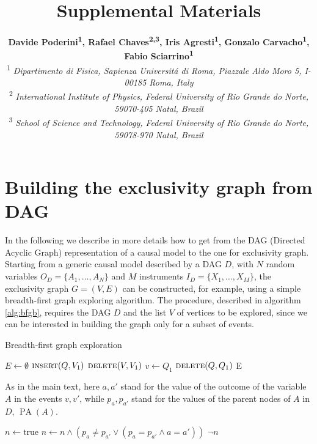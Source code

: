 \documentclass[letterpaper]{article}
\title{Supplemental Materials}
\author{
{\bf Davide Poderini\textsuperscript{1}, 
     Rafael Chaves\textsuperscript{2,3}, 
     Iris Agresti\textsuperscript{1}, 
     Gonzalo Carvacho\textsuperscript{1}, 
     Fabio Sciarrino\textsuperscript{1}}\\
\textsuperscript{1}{\it
Dipartimento di Fisica,
Sapienza Universit\'a di Roma, 
Piazzale Aldo Moro 5, I-00185 Roma, Italy}\\
\textsuperscript{2}{\it
International Institute of Physics, 
Federal University of Rio Grande do Norte, 
59070-405 Natal, Brazil}\\
\textsuperscript{3}{\it
School of Science and Technology, 
Federal University of Rio Grande do Norte, 
59078-970 Natal, Brazil}\\
}
\DeclareMathOperator*{\PA}{PA}
\begin{document}
\maketitle

\section*{Building the exclusivity graph from DAG}
In the following we describe in more details how to get from the DAG
(Directed Acyclic Graph) representation of a causal model to the one
for exclusivity graph.
Starting from a generic causal model described by a DAG $D$, with
$N$ random variables $O_D = \{A_1,\ldots,A_N\}$ and $M$ instruments
$I_D = \{X_1,\ldots,X_M\}$, the exclusivity graph $G = (V, E)$ can be
constructed, for example, using a simple breadth-first graph exploring
algorithm.
The procedure, described in algorithm \ref{alg:bfgb}, requires the DAG $D$
and the list $V$ of vertices to be explored, since we can be interested
in building the graph only for a subset of events.

\begin{algorithm*}
\caption{Breadth-first graph exploration}
\label{alg:bfgb}
\begin{algorithmic}[1]
\State $E \gets \emptyset$
    \State $\Call{insert}{Q, V_1}$ 
    \State $\Call{delete}{V, V_1}$
        \State $v \gets Q_1$ 
        \State $\Call{delete}{Q, Q_1}$
                \State {}
                \State {}
                \State {} 
        \EndIf
        \EndFor
    \EndWhile
\EndWhile
\State \Return E
\EndFunction
\end{algorithmic}
\vspace{1em}
As in the main text, here $a, a'$ stand for the value of the outcome of the
variable $A$ in the events $v, v'$, while $p_a, p_{a'}$ stand for the values
of the parent nodes of $A$ in $D$, $\PA (A)$.

\begin{algorithmic}[1]
    \State $n \gets \text{true}$
        \State $n \gets n \land \left(p_a \neq p_{a'} \lor (p_a = p_{a'} \land a = a') \right)$
    \EndFor
    \State \Return $\neg n$
\EndFunction
\end{algorithmic}
\end{algorithm*}
\end{document}

